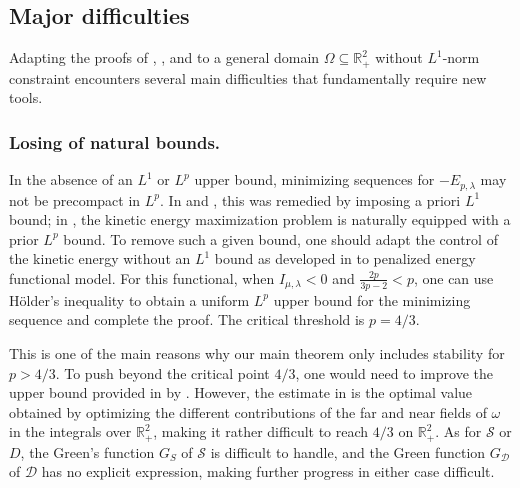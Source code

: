 \documentclass[11pt,letterpaper]{amsart}
\theoremstyle{definition}
\theoremstyle{remark}
\newcommand{\D}{\mathcal{D}}
\renewcommand{\S}{\mathcal{S}}
\newcommand{\R}{\mathbb{R}}
\renewcommand{\O}{\Omega}
\numberwithin{equation}{section}
\begin{document}
\subsection{Major difficulties}
Adapting the proofs of \cite{abe2022stability}, \cite{Abe2025StabilityOL}, \cite{abe2025existence} and \cite{Dong2026StabilityOV} to a general domain $\O \subseteq \R^2_+$ without $L^1$-norm constraint encounters several main difficulties that fundamentally require new tools.

\subsubsection{Losing of natural bounds.} \label{sec:losing natural bound}
In the absence of an $L^1$ or $L^p$ upper bound, minimizing sequences for $-E_{p,\lambda}$ may not be precompact in $L^p$. In \cite{abe2022stability} and \cite{Dong2026StabilityOV}, this was remedied by imposing a priori $L^1$ bound; in \cite{abe2025existence}, the kinetic energy maximization problem is naturally equipped with a prior $L^p$ bound. To remove such a given bound, one should adapt the control of the kinetic energy without an $L^1$ bound as developed in \cite{abe2025existence} to penalized energy functional model. For this functional, when $I_{\mu,\lambda}<0$ and $\frac{2p}{3p-2}<p$, one can use Hölder's inequality to obtain a uniform $L^p$ upper bound for the minimizing sequence and complete the proof. The critical threshold is $p=4/3$.

This is one of the main reasons why our main theorem only includes stability for $p>4/3$. To push beyond the critical point $4/3$, one would need to improve the upper bound provided in by \cite{abe2025existence}. However, the estimate in \cite{abe2025existence} is the optimal value obtained by optimizing the different contributions of the far and near fields of $\omega$ in the integrals over $\mathbb{R}^2_+$, making it rather difficult to reach $4/3$ on $\mathbb{R}^2_+$. As for $\S$ or $D$, the Green's function $G_S$ of $\S$ is difficult to handle, and the Green function $G_\D$ of $\D$ has no explicit expression, making further progress in either case difficult.
\end{document}

